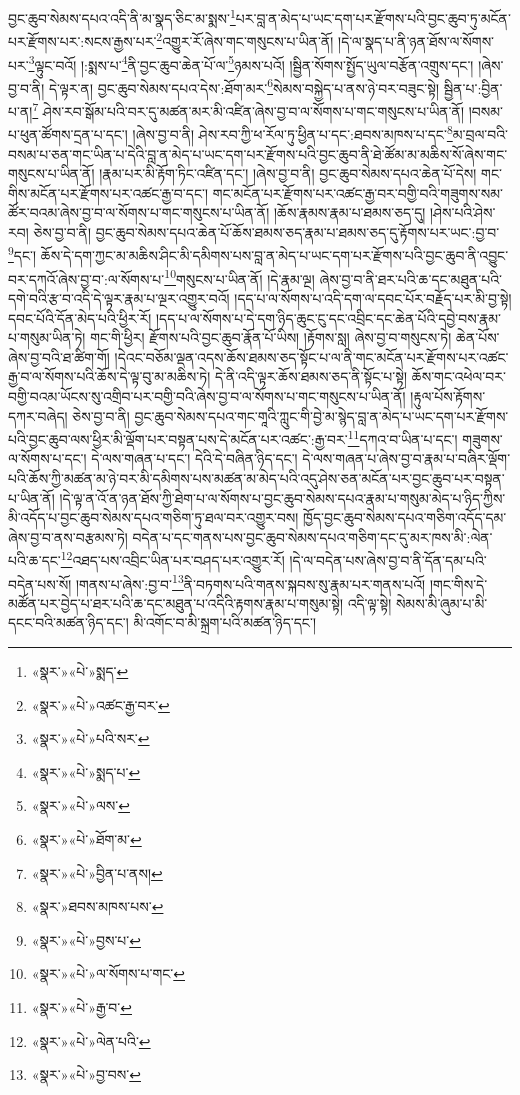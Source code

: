 བྱང་ཆུབ་སེམས་དཔའ་འདི་ནི་མ་སྣད་ཅིང་མ་སྨས་\footnote{«སྣར་»«པེ་»སྨད་}པར་བླ་ན་མེད་པ་ཡང་དག་པར་རྫོགས་པའི་བྱང་ཆུབ་ཏུ་མངོན་པར་རྫོགས་པར་:སངས་རྒྱས་པར་\footnote{«སྣར་»«པེ་»འཚང་རྒྱ་བར་}འགྱུར་རོ་ཞེས་གང་གསུངས་པ་ཡིན་ནོ། །དེ་ལ་སྣད་པ་ནི་ཉན་ཐོས་ལ་སོགས་པར་\footnote{«སྣར་»«པེ་»པའི་སར་}ལྟུང་བའོ། །:སྨས་པ་\footnote{«སྣར་»«པེ་»སྨད་པ་}ནི་བྱང་ཆུབ་ཆེན་པོ་ལ་\footnote{«སྣར་»«པེ་»ལས་}ཉམས་པའོ། །སྦྱིན་སོགས་སྤྱོད་ཡུལ་བརྩོན་འགྲུས་དང་། །ཞེས་བྱ་བ་ནི། དེ་ལྟར་ན། བྱང་ཆུབ་སེམས་དཔའ་དེས་:ཐོག་མར་\footnote{«སྣར་»«པེ་»ཐོག་མ་}སེམས་བསྐྱེད་པ་ནས་ཉེ་བར་བཟུང་སྟེ། སྦྱིན་པ་:བྱིན་པ་ན།\footnote{«སྣར་»«པེ་»བྱིན་པ་ནས།} ཤེས་རབ་སྒོམ་པའི་བར་དུ་མཚན་མར་མི་འཛིན་ཞེས་བྱ་བ་ལ་སོགས་པ་གང་གསུངས་པ་ཡིན་ནོ། །བསམ་པ་ཕུན་ཚོགས་དྲན་པ་དང་། །ཞེས་བྱ་བ་ནི། ཤེས་རབ་ཀྱི་ཕ་རོལ་ཏུ་ཕྱིན་པ་དང་:ཐབས་མཁས་པ་དང་\footnote{«སྣར་»ཐབས་མཁས་པས་}མ་བྲལ་བའི་བསམ་པ་ཅན་གང་ཡིན་པ་དེའི་བླ་ན་མེད་པ་ཡང་དག་པར་རྫོགས་པའི་བྱང་ཆུབ་ནི་ཐེ་ཚོམ་མ་མཆིས་སོ་ཞེས་གང་གསུངས་པ་ཡིན་ནོ། །རྣམ་པར་མི་རྟོག་ཏིང་འཛིན་དང་། །ཞེས་བྱ་བ་ནི། བྱང་ཆུབ་སེམས་དཔའ་ཆེན་པོ་དེས། གང་གིས་མངོན་པར་རྫོགས་པར་འཚང་རྒྱ་བ་དང་། གང་མངོན་པར་རྫོགས་པར་འཚང་རྒྱ་བར་བགྱི་བའི་གཟུགས་སམ་ཚོར་བའམ་ཞེས་བྱ་བ་ལ་སོགས་པ་གང་གསུངས་པ་ཡིན་ནོ། །ཆོས་རྣམས་རྣམ་པ་ཐམས་ཅད་དུ། །ཤེས་པའི་ཤེས་རབ། ཅེས་བྱ་བ་ནི། བྱང་ཆུབ་སེམས་དཔའ་ཆེན་པོ་ཆོས་ཐམས་ཅད་རྣམ་པ་ཐམས་ཅད་དུ་རྟོགས་པར་ཡང་:བྱ་བ་\footnote{«སྣར་»«པེ་»བྱས་པ་}དང་། ཆོས་དེ་དག་ཀྱང་མ་མཆིས་ཤིང་མི་དམིགས་པས་བླ་ན་མེད་པ་ཡང་དག་པར་རྫོགས་པའི་བྱང་ཆུབ་ནི་འབྱུང་བར་དཀའོ་ཞེས་བྱ་བ་:ལ་སོགས་པ་\footnote{«སྣར་»«པེ་»ལ་སོགས་པ་གང་}གསུངས་པ་ཡིན་ནོ། །དེ་རྣམ་ལྔ། ཞེས་བྱ་བ་ནི་ཐར་པའི་ཆ་དང་མཐུན་པའི་དགེ་བའི་རྩ་བ་འདི་དེ་ལྟར་རྣམ་པ་ལྔར་འགྱུར་བའོ། །དད་པ་ལ་སོགས་པ་འདི་དག་ལ་དབང་པོར་བརྗོད་པར་མི་བྱ་སྟེ། དབང་པོའི་དོན་མེད་པའི་ཕྱིར་རོ། །དད་པ་ལ་སོགས་པ་དེ་དག་ཉིད་ཆུང་ངུ་དང་འབྲིང་དང་ཆེན་པོའི་དབྱེ་བས་རྣམ་པ་གསུམ་ཡིན་ཏེ། གང་གི་ཕྱིར། རྫོགས་པའི་བྱང་ཆུབ་རྣོན་པོ་ཡིས། །རྟོགས་སླ། ཞེས་བྱ་བ་གསུངས་ཏེ། ཆེན་པོས་ཞེས་བྱ་བའི་ཐ་ཚིག་གོ། །དེའང་བཅོམ་ལྡན་འདས་ཆོས་ཐམས་ཅད་སྟོང་པ་ལ་ནི་གང་མངོན་པར་རྫོགས་པར་འཚང་རྒྱ་བ་ལ་སོགས་པའི་ཆོས་དེ་ལྟ་བུ་མ་མཆིས་ཏེ། དེ་ནི་འདི་ལྟར་ཆོས་ཐམས་ཅད་ནི་སྟོང་པ་སྟེ། ཆོས་གང་འཕེལ་བར་བགྱི་བའམ་ཡོངས་སུ་འགྲིབ་པར་བགྱི་བའི་ཞེས་བྱ་བ་ལ་སོགས་པ་གང་གསུངས་པ་ཡིན་ནོ། །རྟུལ་པོས་རྟོགས་དཀར་བཞེད། ཅེས་བྱ་བ་ནི། བྱང་ཆུབ་སེམས་དཔའ་གང་གཱའི་ཀླུང་གི་བྱེ་མ་སྙེད་བླ་ན་མེད་པ་ཡང་དག་པར་རྫོགས་པའི་བྱང་ཆུབ་ལས་ཕྱིར་མི་ལྡོག་པར་བསྟན་པས་དེ་མངོན་པར་འཚང་:རྒྱ་བར་\footnote{«སྣར་»«པེ་»རྒྱ་བ་}དཀའ་བ་ཡིན་པ་དང་། གཟུགས་ལ་སོགས་པ་དང་། དེ་ལས་གཞན་པ་དང་། དེའི་དེ་བཞིན་ཉིད་དང་། དེ་ལས་གཞན་པ་ཞེས་བྱ་བ་རྣམ་པ་བཞིར་ལྡོག་པའི་ཆོས་ཀྱི་མཚན་མ་ཉེ་བར་མི་དམིགས་པས་མཚན་མ་མེད་པའི་འདུ་ཤེས་ཅན་མངོན་པར་བྱང་ཆུབ་པར་བསྟན་པ་ཡིན་ནོ། །དེ་ལྟ་ན་འོ་ན་ཉན་ཐོས་ཀྱི་ཐེག་པ་ལ་སོགས་པ་བྱང་ཆུབ་སེམས་དཔའ་རྣམ་པ་གསུམ་མེད་པ་ཉིད་ཀྱིས་མི་འདོད་པ་བྱང་ཆུབ་སེམས་དཔའ་གཅིག་ཏུ་ཐལ་བར་འགྱུར་བས། ཁྱོད་བྱང་ཆུབ་སེམས་དཔའ་གཅིག་འདོད་དམ་ཞེས་བྱ་བ་ནས་བརྩམས་ཏེ། བདེན་པ་དང་གནས་པས་བྱང་ཆུབ་སེམས་དཔའ་གཅིག་དང་དུ་མར་ཁས་མི་:ལེན་པའི་ཆ་དང་\footnote{«སྣར་»«པེ་»ལེན་པའི་}འཐད་པས་འབྲིང་ཡིན་པར་བཤད་པར་འགྱུར་རོ། །དེ་ལ་བདེན་པས་ཞེས་བྱ་བ་ནི་དོན་དམ་པའི་བདེན་པས་སོ། །གནས་པ་ཞེས་:བྱ་བ་\footnote{«སྣར་»«པེ་»བྱ་བས་}ནི་བཏགས་པའི་གནས་སྐབས་སུ་རྣམ་པར་གནས་པའོ། །གང་གིས་དེ་མཚོན་པར་བྱེད་པ་ཐར་པའི་ཆ་དང་མཐུན་པ་འདིའི་རྟགས་རྣམ་པ་གསུམ་སྟེ། འདི་ལྟ་སྟེ། སེམས་མི་ཞུམ་པ་མི་དངང་བའི་མཚན་ཉིད་དང་། མི་འགོང་བ་མི་སྐྲག་པའི་མཚན་ཉིད་དང་། 